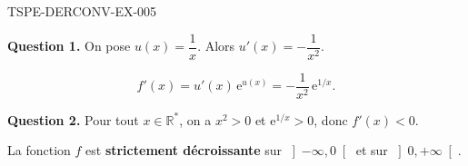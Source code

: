 \begin{corrige}{TSPE-DERCONV-EX-005}

\textbf{Question 1.} On pose $u(x) = \dfrac{1}{x}$. Alors $u'(x) = -\dfrac{1}{x^2}$.

\[ f'(x) = u'(x)\,\mathrm{e}^{u(x)} = -\frac{1}{x^2}\,\mathrm{e}^{1/x}. \]


\textbf{Question 2.} Pour tout $x \in \mathbb{R}^*$, on a $x^2 > 0$ et $\mathrm{e}^{1/x} > 0$, donc $f'(x) < 0$.

La fonction $f$ est \textbf{strictement décroissante} sur $\left]-\infty, 0\right[$ et sur $\left]0, +\infty\right[$.

\end{corrige}
